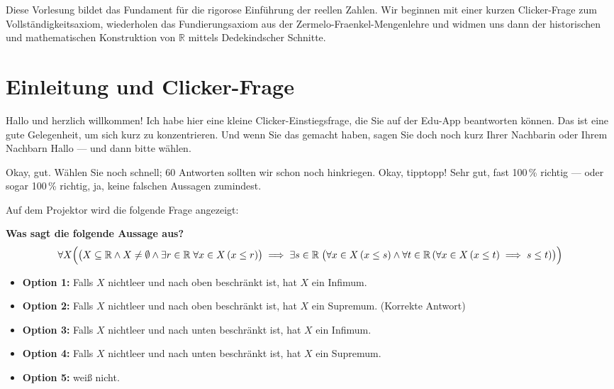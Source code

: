 
\begin{nice-box}[Vorlesungsübersicht]
Diese Vorlesung bildet das Fundament für die rigorose Einführung der reellen Zahlen. Wir beginnen mit einer kurzen Clicker-Frage zum Vollständigkeitsaxiom, wiederholen das Fundierungsaxiom aus der Zermelo-Fraenkel-Mengenlehre und widmen uns dann der historischen und mathematischen Konstruktion von $\mathbb{R}$ mittels Dedekindscher Schnitte.
\end{nice-box}

\section{Einleitung und Clicker-Frage}

\begin{spoken-clean}[00:00:00 - 00:01:43]
Hallo und herzlich willkommen! Ich habe hier eine kleine Clicker-Einstiegsfrage, die Sie auf der Edu-App beantworten können. Das ist eine gute Gelegenheit, um sich kurz zu konzentrieren. Und wenn Sie das gemacht haben, sagen Sie doch noch kurz Ihrer Nachbarin oder Ihrem Nachbarn Hallo --- und dann bitte wählen.

Okay, gut. Wählen Sie noch schnell; 60 Antworten sollten wir schon noch hinkriegen. Okay, tipptopp! Sehr gut, fast 100\,\% richtig --- oder sogar 100\,\% richtig, ja, keine falschen Aussagen zumindest.
\end{spoken-clean}

\begin{meta-note}
Auf dem Projektor wird die folgende Frage angezeigt:
\begin{center}
\textbf{Was sagt die folgende Aussage aus?}
\[
\forall X \Bigl( \bigl( X \subseteq \mathbb{R} \wedge X \neq \emptyset \wedge \exists r \in \mathbb{R} \; \forall x \in X \, (x \le r) \bigr) \implies \exists s \in \mathbb{R} \; \bigl( \forall x \in X \, (x \le s) \wedge \forall t \in \mathbb{R} \, ( \forall x \in X \, (x \le t) \implies s \le t ) \bigr) \Bigr)
\]
\end{center}
\begin{itemize}
    \item \textbf{Option 1:} Falls $X$ nichtleer und nach oben beschränkt ist, hat $X$ ein Infimum.
    \item \textbf{Option 2:} Falls $X$ nichtleer und nach oben beschränkt ist, hat $X$ ein Supremum. (Korrekte Antwort)
    \item \textbf{Option 3:} Falls $X$ nichtleer und nach unten beschränkt ist, hat $X$ ein Infimum.
    \item \textbf{Option 4:} Falls $X$ nichtleer und nach unten beschränkt ist, hat $X$ ein Supremum.
    \item \textbf{Option 5:} weiß nicht.
\end{itemize}
\end{meta-note}


